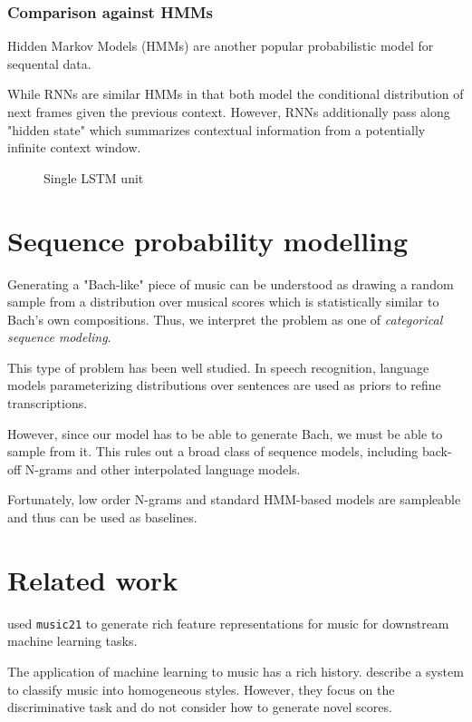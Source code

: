 \subsubsection{Comparison against HMMs}

Hidden Markov Models (HMMs) are another popular probabilistic model for
sequental data. 

While RNNs are similar HMMs in that both model the conditional distribution of
next frames given the previous context. However, RNNs additionally pass along
"hidden state" which summarizes contextual information from a potentially
infinite context window.


\begin{figure}[tb]
    \centering
    
    \caption{Single LSTM unit}
    \label{fig:lstm-unit}
\end{figure}


\section{Sequence probability modelling}

Generating a "Bach-like" piece of music can be understood as drawing a random
sample from a distribution over musical scores which is statistically similar
to Bach's own compositions. Thus, we interpret the problem as one of
\emph{categorical sequence modeling}.

This type of problem has been well studied. In speech recognition, language
models parameterizing distributions over sentences are used as priors to refine
transcriptions.

However, since our model has to be able to generate Bach, we must be able to
sample from it. This rules out a broad class of sequence models, including
back-off N-grams and other interpolated language models.

Fortunately, low order N-grams and standard HMM-based models are sampleable and
thus can be used as baselines.

\section{Related work}

\cite{Cuthbert2011} used
\texttt{music21} to generate rich feature representations for music for
downstream machine learning tasks.

The application of machine learning to music has a rich history.
\cite{Herlands2014} describe a system to classify music into homogeneous
styles. However, they focus on the discriminative task and do not consider
how to generate novel scores.

